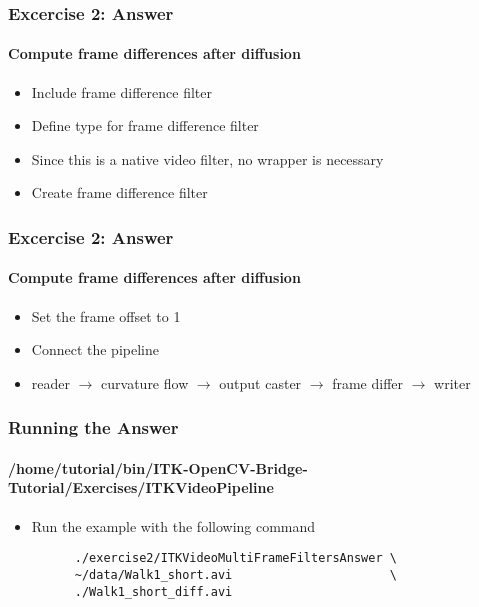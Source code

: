 {
\begin{frame}[fragile]
\frametitle{Excercise 2: Answer}
\framesubtitle{Compute frame differences after diffusion}
\begin{itemize}
\item Include frame difference filter
\pause

\item Define type for frame difference filter
\item Since this is a native video filter, no wrapper is necessary
\pause

\item Create frame difference filter
\end{itemize}
\end{frame}
}

{
\begin{frame}[fragile]
\frametitle{Excercise 2: Answer}
\framesubtitle{Compute frame differences after diffusion}
\begin{itemize}
\item Set the frame offset to 1
\pause

\item Connect the pipeline
\item reader $\rightarrow$ curvature flow $\rightarrow$ output caster
  $\rightarrow$ frame differ $\rightarrow$ writer
\end{itemize}
\end{frame}
}

{
\begin{frame}[fragile]
\frametitle{Running the Answer}
\framesubtitle{/home/tutorial/bin/ITK-OpenCV-Bridge-Tutorial/Exercises/ITKVideoPipeline}
\begin{itemize}
\item Run the example with the following command
\begin{verbatim}
      ./exercise2/ITKVideoMultiFrameFiltersAnswer \
      ~/data/Walk1_short.avi                      \
      ./Walk1_short_diff.avi 
\end{verbatim}
\end{itemize}
\end{frame}
}
